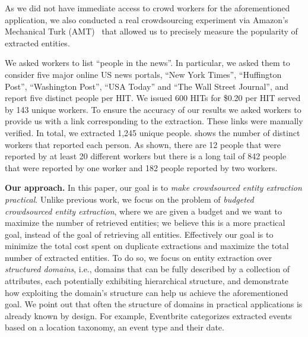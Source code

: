 
As we did not have immediate access to crowd workers for the aforementioned application, we also conducted a real crowdsourcing experiment via Amazon's Mechanical Turk (AMT)~\cite{mturk} that allowed us to precisely measure the popularity of extracted entities. 

\begin{example}
We asked workers to list ``people in the news''. In particular, we asked them to consider five major online US news portals, ``New York Times'', ``Huffington Post'', ``Washington Post'', ``USA  Today'' and ``The Wall Street Journal'', and report five distinct people per HIT. We issued 600 HITs for \$0.20 per HIT served by 143 unique workers. To ensure the accuracy of our results we asked workers to provide us with a link corresponding to the extraction. These links were manually verified.  In total, we extracted 1,245 unique people.  shows the number of distinct workers that reported each person. As shown, there are 12 people that were reported by at least 20 different workers but there is a long tail of 842 people that were reported by one worker and 182 people reported by two workers. 
\end{example}




\noindent\textbf{Our approach.} In this paper, our goal is to {\em make crowdsourced entity extraction practical}. Unlike previous work, we focus on the problem of {\em budgeted crowdsourced entity extraction}, where we are given a budget and we want to maximize the number of retrieved entities; we believe this is a more practical goal, instead of the goal of retrieving all entities.  Effectively our goal is to minimize the total cost spent on duplicate extractions and maximize the total number of extracted entities. To do so, we focus on entity extraction over {\em structured domains}, i.e., domains that can be fully described by a collection of attributes, each potentially exhibiting hierarchical structure, and demonstrate how exploiting the domain's structure can help us achieve the aforementioned goal. We point out that often the structure of domains in practical applications is already known by design. For example, Eventbrite categorizes extracted events based on a location taxonomy, an event type and their date. 

